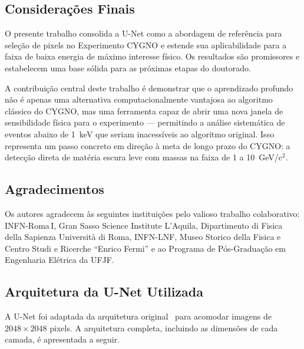 \documentclass[
       oneside,
       english,
       brazil
       ]{abntbibufjf}
\begin{document}
\section{Considerações Finais}
\label{sec:final}

O presente trabalho consolida a U-Net como a abordagem de referência para
seleção de pixels no Experimento CYGNO e estende sua aplicabilidade para a
faixa de baixa energia de máximo interesse físico. Os resultados são
promissores e estabelecem uma base sólida para as próximas etapas do
doutorado.

A contribuição central deste trabalho é demonstrar que o aprendizado profundo
não é apenas uma alternativa computacionalmente vantajosa ao algoritmo clássico
do CYGNO, mas uma ferramenta capaz de abrir uma nova janela de sensibilidade
física para o experimento — permitindo a análise sistemática de eventos abaixo
de 1~keV que seriam inacessíveis ao algoritmo original. Isso representa um
passo concreto em direção à meta de longo prazo do CYGNO: a detecção direta de
matéria escura leve com massas na faixa de 1 a 10~GeV/c$^2$.

\section*{Agradecimentos}

Os autores agradecem às seguintes instituições pelo valioso trabalho
colaborativo: INFN-Roma\,I, Gran Sasso Science Institute L'Aquila,
Dipartimento di Fisica della Sapienza Università di Roma, INFN-LNF, Museo
Storico della Fisica e Centro Studi e Ricerche ``Enrico Fermi'' e ao
Programa de Pós-Graduação em Engenharia Elétrica da UFJF.


\postextual





\begin{apendices}

\chapter{\apendseq Arquitetura da U-Net Utilizada}
\label{apend:unet}

A U-Net foi adaptada da arquitetura original~\cite{ronneberger2015u} para
acomodar imagens de $2048 \times 2048$ pixels. A arquitetura completa,
incluindo as dimensões de cada camada, é apresentada a seguir.



\end{apendices}
\end{document}
